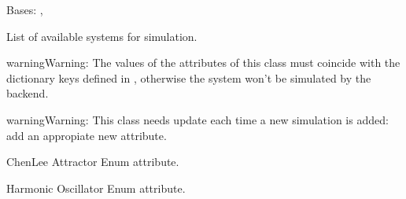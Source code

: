 \documentclass[a4paper,landscape,10pt,english]{sphinxmanual}
\begin{document}
\begin{fulllineitems}
\label{\detokenize{code_docs/simulation_api.controller:simulation_api.controller.schemas.SimSystem}}
Bases: , 

List of available systems for simulation.

\begin{sphinxadmonition}{warning}{Warning:}
The values of the attributes of this class must coincide with the
dictionary keys defined in
{\hyperref[\detokenize{code_docs/simulation_api.simulation:simulation_api.simulation.simulations.Simulations}]{}}, otherwise the
system won’t be simulated by the backend.
\end{sphinxadmonition}

\begin{sphinxadmonition}{warning}{Warning:}
This class needs update each time a new simulation is added: add an
appropiate new attribute.
\end{sphinxadmonition}

\begin{fulllineitems}
\label{\detokenize{code_docs/simulation_api.controller:simulation_api.controller.schemas.SimSystem.ChenLee}}
Chen\sphinxhyphen{}Lee Attractor Enum attribute.

\end{fulllineitems}


\begin{fulllineitems}
\label{\detokenize{code_docs/simulation_api.controller:simulation_api.controller.schemas.SimSystem.HO}}
Harmonic Oscillator Enum attribute.

\end{fulllineitems}


\end{fulllineitems}
\end{document}
